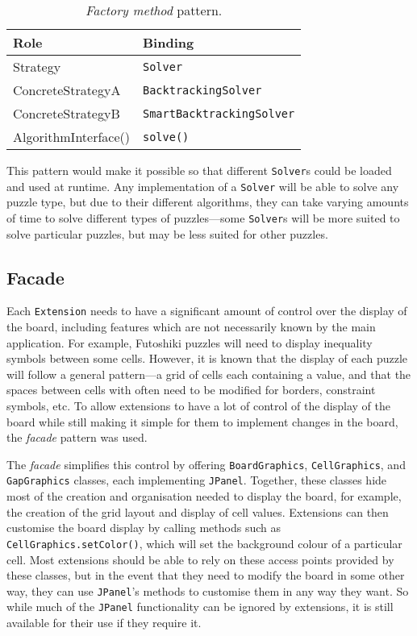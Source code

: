 \documentclass[a4paper, 11pt]{article}
\begin{document}
\begin{table}[h!]
\centering
\begin{tabular}{l l}
\textbf{Role}        & \textbf{Binding} \\ \hline
Strategy             & \texttt{Solver} \\
ConcreteStrategyA    & \texttt{BacktrackingSolver} \\
ConcreteStrategyB    & \texttt{SmartBacktrackingSolver} \\
AlgorithmInterface() & \texttt{solve()} \\
\end{tabular}
\caption{\textit{Factory method} pattern.}
\label{table:strategy}
\end{table}

This pattern would make it possible so that different \texttt{Solver}s could be loaded and used at runtime. Any implementation of a \texttt{Solver} will be able to solve any puzzle type, but due to their different algorithms, they can take varying amounts of time to solve different types of puzzles---some \texttt{Solver}s will be more suited to solve particular puzzles, but may be less suited for other puzzles.

\subsection{Facade}

Each \texttt{Extension} needs to have a significant amount of control over the display of the board, including features which are not necessarily known by the main application. For example, Futoshiki puzzles will need to display inequality symbols between some cells. However, it is known that the display of each puzzle will follow a general pattern---a grid of cells each containing a value, and that the spaces between cells with often need to be modified for borders, constraint symbols, etc. To allow extensions to have a lot of control of the display of the board while still making it simple for them to implement changes in the board, the \textit{facade} pattern was used.

The \textit{facade} simplifies this control by offering \texttt{BoardGraphics}, \texttt{CellGraphics}, and \texttt{GapGraphics} classes, each implementing \texttt{JPanel}. Together, these classes hide most of the creation and organisation needed to display the board, for example, the creation of the grid layout and display of cell values. Extensions can then customise the board display by calling methods such as \texttt{CellGraphics.setColor()}, which will set the background colour of a particular cell. Most extensions should be able to rely on these access points provided by these classes, but in the event that they need to modify the board in some other way, they can use \texttt{JPanel}'s methods to customise them in any way they want. So while much of the \texttt{JPanel} functionality can be ignored by extensions, it is still available for their use if they require it.
\end{document}
